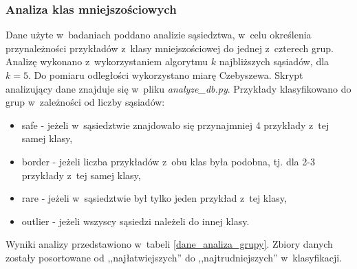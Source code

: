 \subsubsection{Analiza klas mniejszościowych}
Dane użyte w~badaniach poddano analizie sąsiedztwa, w~celu określenia przynależności przykładów z~klasy mniejszościowej do jednej z~czterech grup. Analizę wykonano z~wykorzystaniem algorytmu $k$ najbliższych sąsiadów, dla $k = 5$. Do pomiaru odległości wykorzystano miarę Czebyszewa. Skrypt analizujący dane znajduje się w~pliku \textit{analyze\_db.py}. Przykłady klasyfikowano do grup w~zależności od liczby sąsiadów\cite{przykladyklas}:
\begin{itemize}
	\item safe - jeżeli w~sąsiedztwie znajdowało się przynajmniej 4 przykłady z~tej samej klasy,
	\item border - jeżeli liczba przykładów z~obu klas była podobna, tj. dla 2-3 przykłady z~tej samej klasy,
	\item rare - jeżeli w~sąsiedztwie był tylko jeden przykład z~tej klasy,
	\item outlier - jeżeli wszyscy sąsiedzi należeli do innej klasy.
\end{itemize}
Wyniki analizy przedstawiono w~tabeli \ref{dane_analiza_grupy}. Zbiory danych zostały posortowane od ,,najłatwiejszych'' do ,,najtrudniejszych'' w~klasyfikacji.
\newpage
